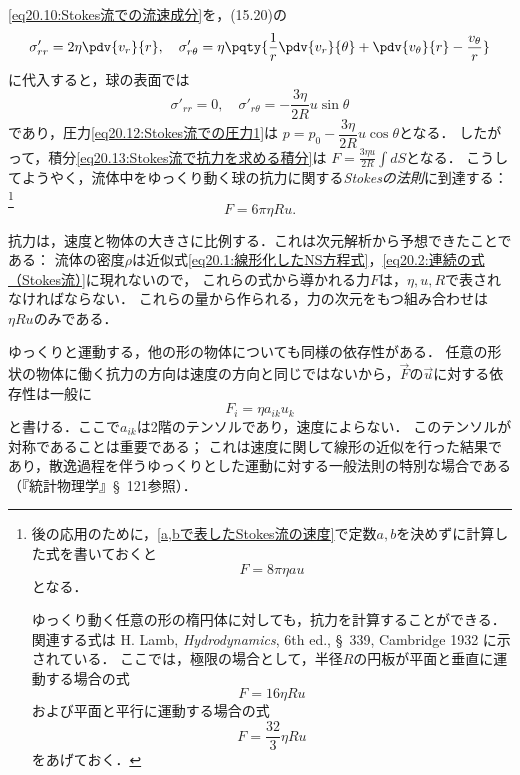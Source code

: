 \eqref{eq20.10:Stokes流での流速成分}を，(15.20)の
\[
    \sigma'_{rr} = 2\eta \pdv{v_r}{r}, \quad
    \sigma'_{r\theta} = \eta \pqty{ \frac{1}{r}\pdv{v_r}{\theta} + \pdv{v_\theta}{r} - \frac{v_\theta}{r} }
\]
に代入すると，球の表面では
\[
    \sigma'_{rr} = 0, \quad
    \sigma'_{r\theta} = -\frac{3\eta}{2R} u \sin\theta 
\]
であり，圧力\eqref{eq20.12:Stokes流での圧力1}は
$p=p_0-\dfrac{3\eta}{2R}u\cos\theta$となる．
したがって，積分\eqref{eq20.13:Stokes流で抗力を求める積分}は
$\displaystyle F = \frac{3\eta u}{2R} \int dS$となる．
こうしてようやく，流体中をゆっくり動く球の抗力に関する\emph{Stokesの法則}に到達する：
\footnote{
後の応用のために，\eqref{a,bで表したStokes流の速度}で定数$a,b$を決めずに計算した式を書いておくと
\[
    F = 8\pi\eta au
    \tag{20.14a}
\]
となる．

ゆっくり動く任意の形の楕円体に対しても，抗力を計算することができる．
関連する式は H. Lamb, \textit{Hydrodynamics}, 6th ed., \S~339, Cambridge 1932 に示されている．
ここでは，極限の場合として，半径$R$の円板が平面と垂直に運動する場合の式
\[
    F = 16\eta Ru
\]
および平面と平行に運動する場合の式
\[
    F = \frac{32}{3}\eta Ru
\]
をあげておく．
}
\begin{equation}
    F = 6\pi\eta Ru .
\end{equation}


抗力は，速度と物体の大きさに比例する．これは次元解析から予想できたことである：
流体の密度$\rho$は近似式\eqref{eq20.1:線形化したNS方程式}，\eqref{eq20.2:連続の式（Stokes流）}に現れないので，
これらの式から導かれる力$F$は，$\eta,u,R$で表されなければならない．
これらの量から作られる，力の次元をもつ組み合わせは$\eta Ru$のみである．


ゆっくりと運動する，他の形の物体についても同様の依存性がある．
任意の形状の物体に働く抗力の方向は速度の方向と同じではないから，$\vec{F}$の$\vec{u}$に対する依存性は一般に
\begin{equation}
    F_i = \eta a_{ik} u_k
\end{equation}
と書ける．ここで$a_{ik}$は2階のテンソルであり，速度によらない．
このテンソルが対称であることは重要である；
これは速度に関して線形の近似を行った結果であり，散逸過程を伴うゆっくりとした運動に対する一般法則の特別な場合である（『統計物理学』\S~121参照）．



